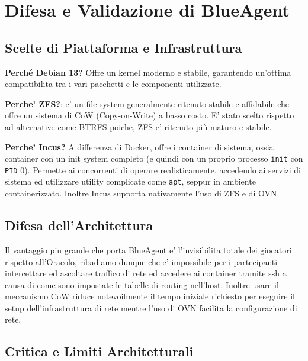 \section{Difesa e Validazione di
BlueAgent}\label{difesa-e-validazione-di-blueagent}

\subsection{Scelte di Piattaforma e
Infrastruttura}\label{scelte-di-piattaforma-e-infrastruttura}

\textbf{Perché Debian 13?} Offre un kernel moderno e stabile, garantendo
un'ottima compatibilita tra i vari pacchetti e le componenti utilizzate.

\textbf{Perche' ZFS?}: e' un file system generalmente ritenuto stabile e
affidabile che offre un sistema di CoW (Copy-on-Write) a basso costo. E'
stato scelto rispetto ad alternative come BTRFS poiche, ZFS e' ritenuto
più maturo e stabile.

\textbf{Perche' Incus?} A differenza di Docker, offre i container di
sistema, ossia container con un init system completo (e quindi con un
proprio processo \passthrough{\lstinline!init!} con
\passthrough{\lstinline!PID!} 0). Permette ai concorrenti di operare
realisticamente, accedendo ai servizi di sistema ed utilizzare utility
complicate come \passthrough{\lstinline!apt!}, seppur in ambiente
containerizzato. Inoltre Incus supporta nativamente l'uso di ZFS e di
OVN.

\subsection{Difesa dell'Architettura}\label{difesa-dellarchitettura}

Il vantaggio piu grande che porta BlueAgent e' l'invisibilita totale dei
giocatori rispetto all'Oracolo, ribadiamo dunque che e' impossibile per
i partecipanti intercettare ed ascoltare traffico di rete ed accedere ai
container tramite ssh a causa di come sono impostate le tabelle di
routing nell'host. Inoltre usare il meccanismo CoW riduce notevoilmente
il tempo iniziale richiesto per eseguire il setup dell'infrastruttura di
rete mentre l'uso di OVN facilita la configurazione di rete.

\subsection{Critica e Limiti
Architetturali}\label{critica-e-limiti-architetturali}

